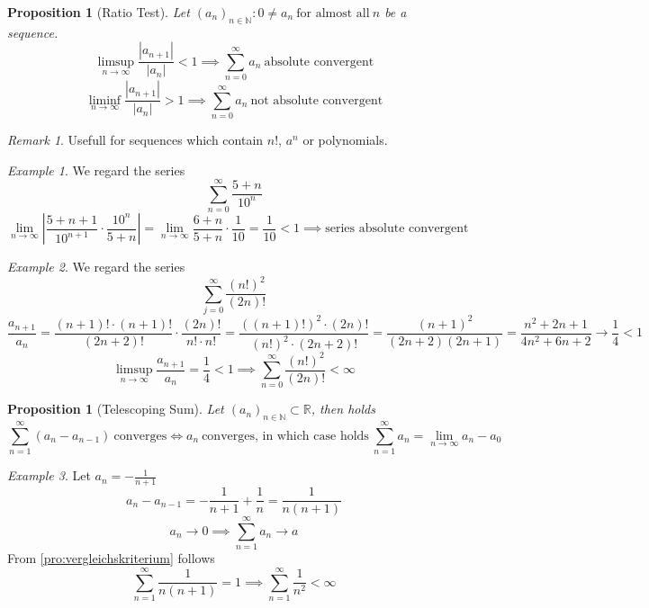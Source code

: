 \documentclass[english,titlepage]{uzhpub}
\theoremstyle{definition}
\theoremstyle{plain}
\newtheorem{proposition}[definition]{Proposition}
\theoremstyle{remark}
\newtheorem*{remark}{Remark}
\theoremstyle{example}
\newtheorem*{example}{Example}
\begin{document}
   \begin{proposition}[Ratio Test]\label{pro:ratio_test}
      Let \((a_n)_{n \in \mathbb{N}}: 0 \neq a_n~\text{for almost all}~n\) be a sequence.
      \[\limsup_{n \to \infty} \frac{|a_{n+1}|}{|a_n|} < 1 \implies \sum_{n=0}^\infty a_n~\text{absolute convergent}\]
      \[\liminf_{n \to \infty} \frac{|a_{n+1}|}{|a_n|} > 1 \implies \sum_{n=0}^\infty a_n~\text{not absolute convergent}\]
   \end{proposition}
   \begin{remark}
      Usefull for sequences which contain \(n!\), \(a^n\) or polynomials.
   \end{remark}
   \begin{example}
      We regard the series
      \[\sum_{n=0}^\infty \frac{5 + n}{10^n}\]
      \[\lim_{n \to \infty} \left|\frac{5 + n + 1}{10^{n+1}} \cdot \frac{10^n}{5 + n}\right| = \lim_{n \to \infty} \frac{6+n}{5+n} \cdot \frac{1}{10} = \frac{1}{10} < 1 \implies \text{series absolute convergent}\]
   \end{example}
   \begin{example}
      We regard the series
      \[\sum_{j=0}^\infty \frac{(n!)^2}{(2n)!}\]
      \[\frac{a_{n+1}}{a_n} = \frac{(n+1)! \cdot (n+1)!}{(2n + 2)!} \cdot \frac{(2n)!}{n! \cdot n!} = \frac{((n+1)!)^2 \cdot (2n)!}{(n!)^2 \cdot (2n + 2)!} = \frac{(n+1)^2}{(2n + 2)(2n + 1)} = \frac{n^2 + 2n + 1}{4n^2 + 6n + 2} \to \frac{1}{4} < 1\]
      \[\limsup_{n \to \infty} \frac{a_{n+1}}{a_n} = \frac{1}{4} < 1 \implies \sum_{n=0}^\infty \frac{(n!)^2}{(2n)!} < \infty\]
   \end{example}

   \begin{proposition}[Telescoping Sum]\label{pro:telesc_sum}
      Let \((a_n)_{n \in \mathbb{N}} \subset \mathbb{R}\), then holds
      \[\sum_{n=1}^\infty (a_n - a_{n-1})~\text{converges} \iff a_n~\text{converges, in which case holds}~\sum_{n=1}^\infty a_n = \lim_{n \to \infty} a_n - a_0\]
   \end{proposition}
   \begin{example}
      Let \(a_n = -\frac{1}{n+1}\)
      \[a_n - a_{n-1} = -\frac{1}{n+1} + \frac{1}{n} = \frac{1}{n(n+1)}\]
      \[a_n \to 0 \implies \sum_{n=1}^\infty a_n \to a\]
      From \cref{pro:vergleichskriterium} follows
      \[\sum_{n=1}^\infty \frac{1}{n(n+1)} = 1 \implies \sum_{n=1}^\infty \frac{1}{n^2} < \infty\]
   \end{example}
\end{document}

